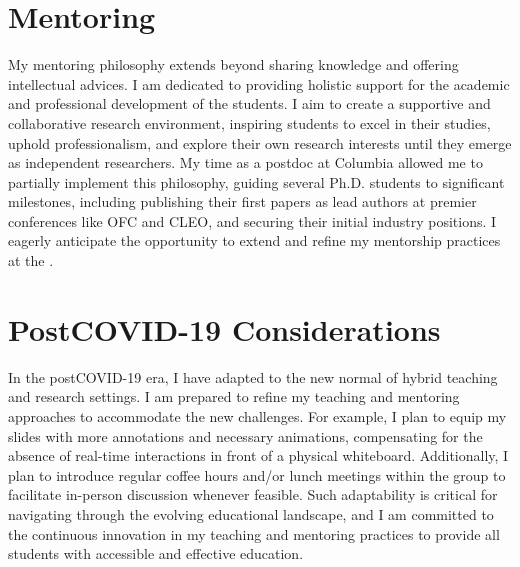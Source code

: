 \section{Mentoring}
My mentoring philosophy extends beyond sharing knowledge and offering intellectual advices. I am dedicated to providing holistic support for the academic and professional development of the students. I aim to create a supportive and collaborative research environment, inspiring students to excel in their studies, uphold professionalism, and explore their own research interests until they emerge as independent researchers. My time as a postdoc at Columbia allowed me to partially implement this philosophy, guiding several Ph.D. students to significant milestones, including publishing their first papers as lead authors at premier conferences like OFC and CLEO, and securing their initial industry positions. I eagerly anticipate the opportunity to extend and refine my mentorship practices at the \appSchool{}.

\section{Post\textendash COVID-19 Considerations}

In the post\textendash COVID-19 era, I have adapted to the new normal of hybrid teaching and research settings. I am prepared to refine my teaching and mentoring approaches to accommodate the new challenges. For example, I plan to equip my slides with more annotations and necessary animations, compensating for the absence of real-time interactions in front of a physical whiteboard. Additionally, I plan to introduce regular coffee hours and/or lunch meetings within the group to facilitate in-person discussion whenever feasible. Such adaptability is critical for navigating through the evolving educational landscape, and I am committed to the continuous innovation in my teaching and mentoring practices to provide all students with accessible and effective education.